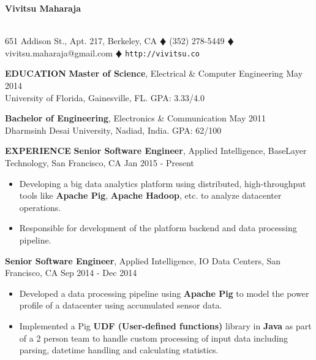 \documentclass[10pt, letterpaper]{article}
\begin{document}
\begin{center}
\textbf{\Large Vivitsu Maharaja}
\date{}
\thispagestyle{empty}
\smallskip \\
651 Addison St., Apt. 217, Berkeley, CA $\vardiamond$ (352) 278-5449 $\vardiamond$ vivitsu.maharaja@gmail.com $\vardiamond$ \texttt{http://vivitsu.co}
\end{center}

\textbf{EDUCATION}
\smallskip
\newline
{\bf Master of Science}, Electrical \& Computer Engineering \hfill May 2014\\
University of Florida, Gainesville, FL. \hfill GPA: 3.33/4.0

{\bf Bachelor of Engineering}, Electronics \& Communication \hfill May 2011\\
Dharmsinh Desai University, Nadiad, India. \hfill GPA: 62/100

\textbf{EXPERIENCE}
\smallskip
\newline
\textbf{Senior Software Engineer}, Applied Intelligence, BaseLayer Technology, San Francisco, CA \hfill Jan 2015 - Present
\begin{itemize}
    \item Developing a big data analytics platform using distributed, high-throughput tools
like \textbf{Apache Pig}, \textbf{Apache Hadoop}, etc. to analyze datacenter operations.
    \item Responsible for development of the platform backend and data processing pipeline.
\end{itemize}

\textbf{Senior Software Engineer}, Applied Intelligence, IO Data Centers, San Francisco, CA \hfill Sep 2014 - Dec 2014
\begin{itemize}
    \item Developed a data processing pipeline using \textbf{Apache Pig} to model 
the power profile of a datacenter using accumulated sensor data.
    \item Implemented a Pig \textbf{UDF (User-defined functions)} library in \textbf{Java} as part of a 2 person team
to handle custom processing of input data including parsing, datetime handling and
calculating statistics.
\end{itemize}
\end{document}
